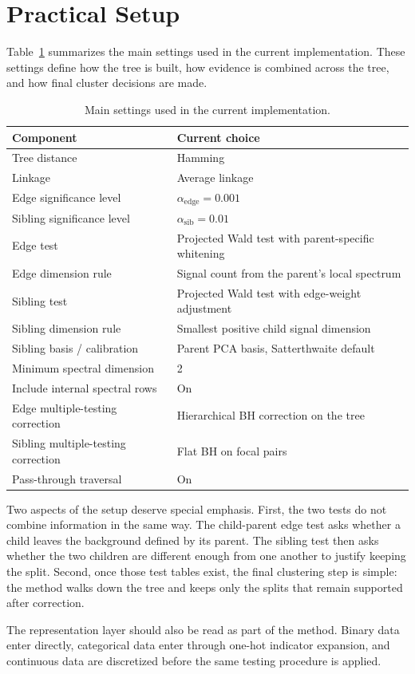 
\section{Practical Setup}

Table~\ref{tab:defaults} summarizes the main settings used in the current
implementation. These settings define how the tree is built, how evidence is
combined across the tree, and how final cluster decisions are made.

\begin{table}[ht]
\centering
\begin{tabular}{ll}
\toprule
Component & Current choice \\
\midrule
Tree distance & Hamming \\
Linkage & Average linkage \\
Edge significance level & $\alpha_{\mathrm{edge}} = 0.001$ \\
Sibling significance level & $\alpha_{\mathrm{sib}} = 0.01$ \\
Edge test & Projected Wald test with parent-specific whitening \\
Edge dimension rule & Signal count from the parent's local spectrum \\
Sibling test & Projected Wald test with edge-weight adjustment \\
Sibling dimension rule & Smallest positive child signal dimension \\
Sibling basis / calibration & Parent PCA basis, Satterthwaite default \\
Minimum spectral dimension & 2 \\
Include internal spectral rows & On \\
Edge multiple-testing correction & Hierarchical BH correction on the tree \\
Sibling multiple-testing correction & Flat BH on focal pairs \\
Pass-through traversal & On \\
\bottomrule
\end{tabular}
\caption{Main settings used in the current implementation.}
\label{tab:defaults}
\end{table}

Two aspects of the setup deserve special emphasis. First, the two tests do not
combine information in the same way. The child-parent edge test asks whether a
child leaves the background defined by its parent. The sibling test then asks
whether the two children are different enough from one another to justify
keeping the split. Second, once those test tables exist, the final clustering
step is simple: the method walks down the tree and keeps only the splits that
remain supported after correction.

The representation layer should also be read as part of the method. Binary data
enter directly, categorical data enter through one-hot indicator expansion, and
continuous data are discretized before the same testing procedure is applied.
